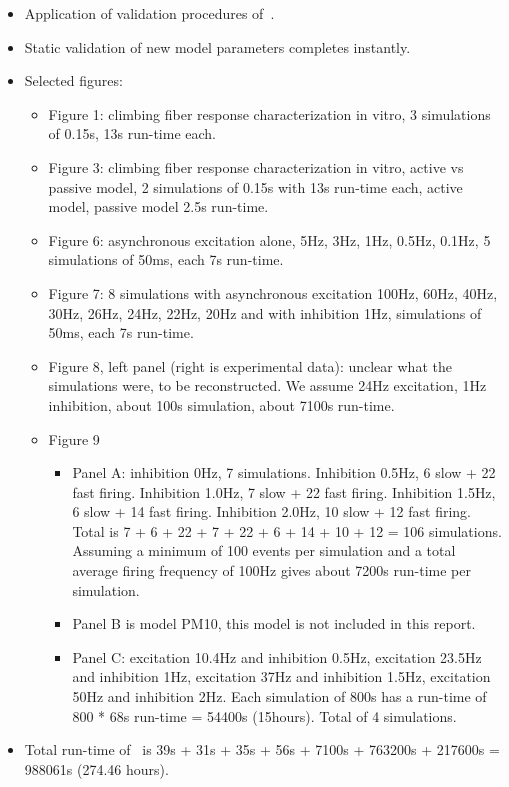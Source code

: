 \documentclass[12pt]{article}
\begin{document}
\begin{itemize}
\begin{itemize}
  \item Application of validation procedures
    of~\cite{De-Schutter-E:1994vn}.
  \item Static validation of new model parameters completes instantly.
  \item Selected figures:
    \begin{itemize}
    \item Figure 1: climbing fiber response characterization in vitro,
      3 simulations of 0.15s, 13s run-time each.
    \item Figure 3: climbing fiber response characterization in vitro,
      active vs passive model, 2 simulations of 0.15s with 13s
      run-time each, active model, passive model 2.5s run-time.
    \item Figure 6: asynchronous excitation alone, 5Hz, 3Hz, 1Hz, 0.5Hz,
      0.1Hz, 5 simulations of 50ms, each 7s run-time.
    \item Figure 7: 8 simulations with asynchronous excitation 100Hz,
      60Hz, 40Hz, 30Hz, 26Hz, 24Hz, 22Hz, 20Hz and with inhibition
      1Hz, simulations of 50ms, each 7s run-time.
    \item Figure 8, left panel (right is experimental data): unclear
      what the simulations were, to be reconstructed.  We assume 24Hz
      excitation, 1Hz inhibition, about 100s simulation, about 7100s
      run-time.
    \item Figure 9
      \begin{itemize}
      \item Panel A: inhibition 0Hz, 7 simulations.  Inhibition 0.5Hz,
        6 slow + 22 fast firing.  Inhibition 1.0Hz, 7 slow + 22 fast
        firing.  Inhibition 1.5Hz, 6 slow + 14 fast firing.
        Inhibition 2.0Hz, 10 slow + 12 fast firing.  Total is 7 + 6 +
        22 + 7 + 22 + 6 + 14 + 10 + 12 = 106 simulations.  Assuming a
        minimum of 100 events per simulation and a total average
        firing frequency of 100Hz gives about 7200s run-time per
        simulation.
      \item Panel B is model PM10, this model is not included in this
        report.
      \item Panel C: excitation 10.4Hz and inhibition 0.5Hz,
        excitation 23.5Hz and inhibition 1Hz, excitation 37Hz and
        inhibition 1.5Hz, excitation 50Hz and inhibition 2Hz.  Each
        simulation of 800s has a run-time of 800 * 68s run-time =
        54400s (15hours).  Total of 4 simulations.
      \end{itemize}
    \end{itemize}
  \item Total run-time of~\cite{E:1994hc} is 39s + 31s + 35s + 56s +
    7100s + 763200s + 217600s = 988061s (274.46 hours).



\end{itemize}
\end{itemize}
\end{document}
